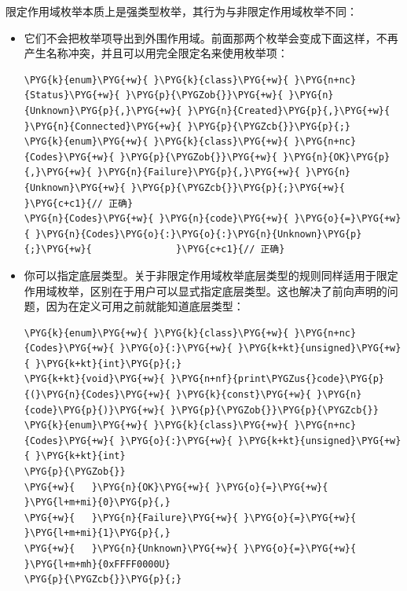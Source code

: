 
限定作用域枚举本质上是强类型枚举，其行为与非限定作用域枚举不同：



\begin{itemize}
\item 它们不会把枚举项导出到外围作用域。前面那两个枚举会变成下面这样，不再产生名称冲突，并且可以用完全限定名来使用枚举项：



\begin{codeblockbg}
\begin{Verbatim}[commandchars=\\\{\},breaklines=true,breakanywhere=true,fontsize=\codefont,xleftmargin=17bp]
\PYG{k}{enum}\PYG{+w}{ }\PYG{k}{class}\PYG{+w}{ }\PYG{n+nc}{Status}\PYG{+w}{ }\PYG{p}{\PYGZob{}}\PYG{+w}{ }\PYG{n}{Unknown}\PYG{p}{,}\PYG{+w}{ }\PYG{n}{Created}\PYG{p}{,}\PYG{+w}{ }\PYG{n}{Connected}\PYG{+w}{ }\PYG{p}{\PYGZcb{}}\PYG{p}{;}
\PYG{k}{enum}\PYG{+w}{ }\PYG{k}{class}\PYG{+w}{ }\PYG{n+nc}{Codes}\PYG{+w}{ }\PYG{p}{\PYGZob{}}\PYG{+w}{ }\PYG{n}{OK}\PYG{p}{,}\PYG{+w}{ }\PYG{n}{Failure}\PYG{p}{,}\PYG{+w}{ }\PYG{n}{Unknown}\PYG{+w}{ }\PYG{p}{\PYGZcb{}}\PYG{p}{;}\PYG{+w}{ }\PYG{c+c1}{// 正确}
\PYG{n}{Codes}\PYG{+w}{ }\PYG{n}{code}\PYG{+w}{ }\PYG{o}{=}\PYG{+w}{ }\PYG{n}{Codes}\PYG{o}{:}\PYG{o}{:}\PYG{n}{Unknown}\PYG{p}{;}\PYG{+w}{               }\PYG{c+c1}{// 正确}
\end{Verbatim}
\end{codeblockbg}



\item 你可以指定底层类型。关于非限定作用域枚举底层类型的规则同样适用于限定作用域枚举，区别在于用户可以显式指定底层类型。这也解决了前向声明的问题，因为在定义可用之前就能知道底层类型：



\begin{codeblockbg}
\begin{Verbatim}[commandchars=\\\{\},breaklines=true,breakanywhere=true,fontsize=\codefont,xleftmargin=17bp]
\PYG{k}{enum}\PYG{+w}{ }\PYG{k}{class}\PYG{+w}{ }\PYG{n+nc}{Codes}\PYG{+w}{ }\PYG{o}{:}\PYG{+w}{ }\PYG{k+kt}{unsigned}\PYG{+w}{ }\PYG{k+kt}{int}\PYG{p}{;}
\PYG{k+kt}{void}\PYG{+w}{ }\PYG{n+nf}{print\PYGZus{}code}\PYG{p}{(}\PYG{n}{Codes}\PYG{+w}{ }\PYG{k}{const}\PYG{+w}{ }\PYG{n}{code}\PYG{p}{)}\PYG{+w}{ }\PYG{p}{\PYGZob{}}\PYG{p}{\PYGZcb{}}
\PYG{k}{enum}\PYG{+w}{ }\PYG{k}{class}\PYG{+w}{ }\PYG{n+nc}{Codes}\PYG{+w}{ }\PYG{o}{:}\PYG{+w}{ }\PYG{k+kt}{unsigned}\PYG{+w}{ }\PYG{k+kt}{int}
\PYG{p}{\PYGZob{}}
\PYG{+w}{   }\PYG{n}{OK}\PYG{+w}{ }\PYG{o}{=}\PYG{+w}{ }\PYG{l+m+mi}{0}\PYG{p}{,}
\PYG{+w}{   }\PYG{n}{Failure}\PYG{+w}{ }\PYG{o}{=}\PYG{+w}{ }\PYG{l+m+mi}{1}\PYG{p}{,}
\PYG{+w}{   }\PYG{n}{Unknown}\PYG{+w}{ }\PYG{o}{=}\PYG{+w}{ }\PYG{l+m+mh}{0xFFFF0000U}
\PYG{p}{\PYGZcb{}}\PYG{p}{;}
\end{Verbatim}
\end{codeblockbg}



\end{itemize}
